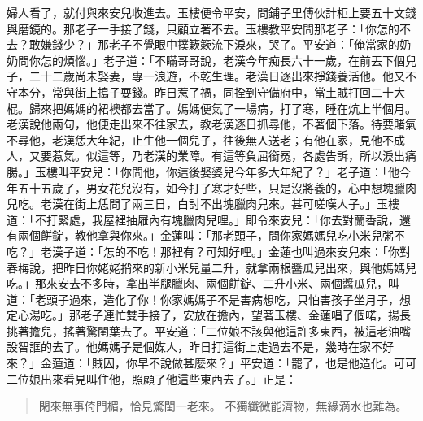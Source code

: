 婦人看了，就付與來安兒收進去。玉樓便令平安，問鋪子里傅伙計柜上要五十文錢與磨鏡的。那老子一手接了錢，只顧立著不去。玉樓教平安問那老子：「你怎的不去？敢嫌錢少？」那老子不覺眼中撲簌簌流下淚來，哭了。平安道：「俺當家的奶奶問你怎的煩惱。」老子道：「不瞞哥哥說，老漢今年痴長六十一歲，在前丟下個兒子，二十二歲尚未娶妻，專一浪遊，不乾生理。老漢日逐出來掙錢養活他。他又不守本分，常與街上搗子耍錢。昨日惹了禍，同拴到守備府中，當土賊打回二十大棍。歸來把媽媽的裙襖都去當了。媽媽便氣了一場病，打了寒，睡在炕上半個月。老漢說他兩句，他便走出來不往家去，教老漢逐日抓尋他，不著個下落。待要賭氣不尋他，老漢恁大年紀，止生他一個兒子，往後無人送老；有他在家，見他不成人，又要惹氣。似這等，乃老漢的業障。有這等負屈銜冤，各處告訴，所以淚出痛腸。」玉樓叫平安兒：「你問他，你這後娶婆兒今年多大年紀了？」老子道：「他今年五十五歲了，男女花兒沒有，如今打了寒才好些，只是沒將養的，心中想塊臘肉兒吃。老漢在街上恁問了兩三日，白討不出塊臘肉兒來。甚可嗟嘆人子。」玉樓道：「不打緊處，我屋裡抽屜內有塊臘肉兒哩。」即令來安兒：「你去對蘭香說，還有兩個餅錠，教他拿與你來。」金蓮叫：「那老頭子，問你家媽媽兒吃小米兒粥不吃？」老漢子道：「怎的不吃！那裡有？可知好哩。」金蓮也叫過來安兒來：「你對春梅說，把昨日你姥姥捎來的新小米兒量二升，就拿兩根醬瓜兒出來，與他媽媽兒吃。」那來安去不多時，拿出半腿臘肉、兩個餅錠、二升小米、兩個醬瓜兒，叫道：「老頭子過來，造化了你！你家媽媽子不是害病想吃，只怕害孩子坐月子，想定心湯吃。」那老子連忙雙手接了，安放在擔內，望著玉樓、金蓮唱了個喏，揚長挑著擔兒，搖著驚閨葉去了。平安道：「二位娘不該與他這許多東西，被這老油嘴設智誆的去了。他媽媽子是個媒人，昨日打這街上走過去不是，幾時在家不好來？」金蓮道：「賊囚，你早不說做甚麼來？」平安道：「罷了，也是他造化。可可二位娘出來看見叫住他，照顧了他這些東西去了。」正是：
\begin{quote}
閑來無事倚門楣，恰見驚閨一老來。
不獨纖微能濟物，無緣滴水也難為。
\end{quote}
